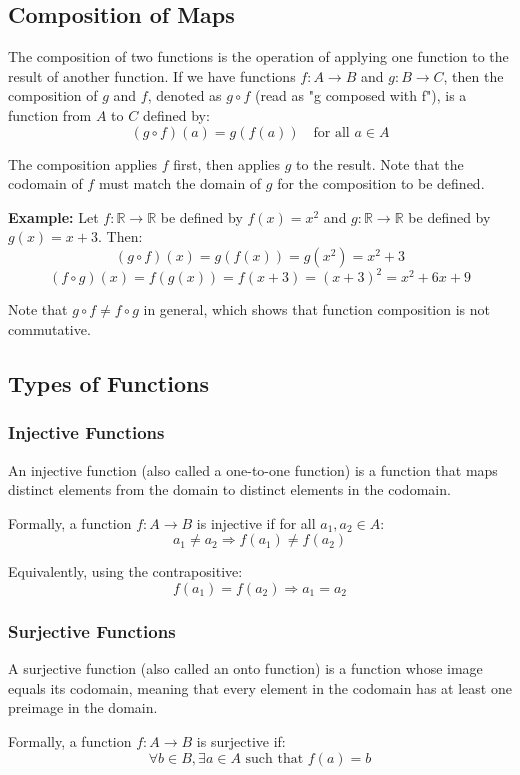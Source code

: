 \subsection{Composition of Maps}
The composition of two functions is the operation of applying one function to the result of another function. If we have functions $f: A \rightarrow B$ and $g: B \rightarrow C$, then the composition of $g$ and $f$, denoted as $g \circ f$ (read as "g composed with f"), is a function from $A$ to $C$ defined by:
\[
(g \circ f)(a) = g(f(a)) \quad \text{for all } a \in A
\]

The composition applies $f$ first, then applies $g$ to the result. Note that the codomain of $f$ must match the domain of $g$ for the composition to be defined.

\textbf{Example:} Let $f: \mathbb{R} \rightarrow \mathbb{R}$ be defined by $f(x) = x^2$ and $g: \mathbb{R} \rightarrow \mathbb{R}$ be defined by $g(x) = x+3$. Then:
\[
(g \circ f)(x) = g(f(x)) = g(x^2) = x^2 + 3
\]
\[
(f \circ g)(x) = f(g(x)) = f(x+3) = (x+3)^2 = x^2 + 6x + 9
\]

Note that $g \circ f \neq f \circ g$ in general, which shows that function composition is not commutative.

\subsection{Types of Functions}
\subsubsection{Injective Functions}
An injective function (also called a one-to-one function) is a function that maps distinct elements from the domain to distinct elements in the codomain. 

Formally, a function $f: A \rightarrow B$ is injective if for all $a_1, a_2 \in A$:
\[
a_1 \neq a_2 \Rightarrow f(a_1) \neq f(a_2)
\]

Equivalently, using the contrapositive:
\[
f(a_1) = f(a_2) \Rightarrow a_1 = a_2
\]

\subsubsection{Surjective Functions}
A surjective function (also called an onto function) is a function whose image equals its codomain, meaning that every element in the codomain has at least one preimage in the domain.

Formally, a function $f: A \rightarrow B$ is surjective if:
\[
\forall b \in B, \exists a \in A \text{ such that } f(a) = b
\]

